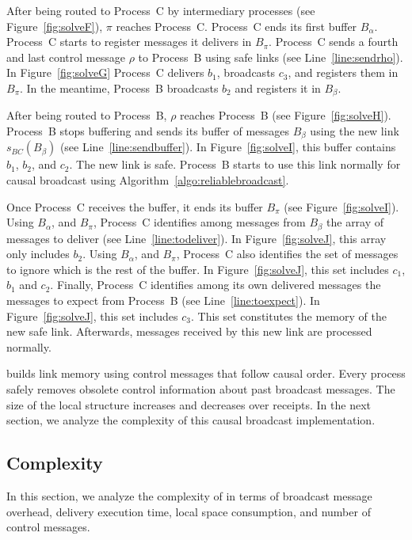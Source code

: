 \noindent After being routed to Process~C by intermediary processes (see
Figure~\ref{fig:solveF}), $\pi$ reaches Process~C. Process~C ends its first
buffer $B_\alpha$.  Process~C starts to register messages it delivers in
$B_\pi$.  Process~C sends a fourth and last control message $\rho$ to Process~B
using safe links (see Line~\ref{line:sendrho}). In Figure~\ref{fig:solveG}
Process~C delivers $b_1$, broadcasts $c_3$, and registers them in $B_\pi$. In
the meantime, Process~B broadcasts $b_2$ and registers it in $B_\beta$.

\noindent After being routed to Process~B, $\rho$ reaches Process~B (see
Figure~\ref{fig:solveH}).  Process~B stops buffering and sends its buffer of
messages $B_\beta$ using the new link $s_{BC}(B_\beta)$ (see
Line~\ref{line:sendbuffer}). In Figure~\ref{fig:solveI}, this buffer contains
$b_1$, $b_2$, and $c_2$. The new link is safe. Process~B starts to use this link
normally for causal broadcast using Algorithm~\ref{algo:reliablebroadcast}.

\noindent Once Process~C receives the buffer, it ends its buffer $B_\pi$ (see
Figure~\ref{fig:solveI}). Using $B_\alpha$, and $B_\pi$, Process~C identifies
among messages from $B_\beta$ the array of messages to deliver (see
Line~\ref{line:todeliver}). In Figure~\ref{fig:solveJ}, this array only includes
$b_2$.  Using $B_\alpha$, and $B_\pi$, Process~C also identifies the set of
messages to ignore which is the rest of the buffer. In Figure~\ref{fig:solveJ},
this set includes $c_1$, $b_1$ and $c_2$. Finally, Process~C identifies among its own
delivered messages the messages to expect from Process~B (see
Line~\ref{line:toexpect}). In Figure~\ref{fig:solveJ}, this set includes $c_3$.
This set constitutes the memory of the new safe link.  Afterwards, messages
received by this new link are processed normally.


\RPCBROADCAST builds link memory using control messages that follow causal
order. Every process safely removes obsolete control information about past
broadcast messages.  The size of the local structure increases and decreases
over receipts.  In the next section, we analyze the complexity of this causal
broadcast implementation.

\subsection{Complexity}
\label{subsec:complexity}

In this section, we analyze the complexity of \RPCBROADCAST in terms of
broadcast message overhead, delivery execution time, local space consumption,
and number of control messages.

